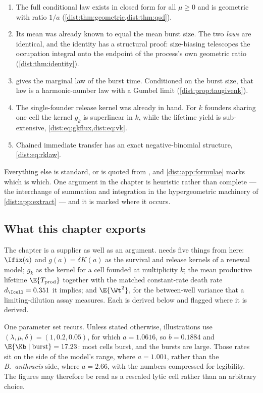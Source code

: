 \begin{enumerate}[leftmargin=*,itemsep=2pt]
\item The full conditional law exists in closed form for all $\mu\ge0$ and is
geometric with ratio $1/a$ (\cref{dist:thm:geometric,dist:thm:qsd}).
\item Its mean was already known to equal the mean burst size. The two
\emph{laws} are identical, and the identity has a structural proof:
size-biasing telescopes the occupation integral onto the endpoint of the
process's own geometric ratio (\cref{dist:thm:identity}).
\item \ChCorecap{} gives the marginal law of the burst time. Conditioned on
the burst size, that law is a harmonic-number law with a Gumbel limit
(\cref{dist:prop:taugivenk}).
\item The single-founder release kernel was already in hand. For $k$ founders
sharing one cell the kernel $g_k$ is superlinear in $k$, while the lifetime
yield is sub-extensive, \cref{dist:eq:gkflux,dist:eq:vk}.
\item Chained immediate transfer has an exact negative-binomial structure,
\cref{dist:eq:rklaw}.
\end{enumerate}

Everything else is standard, or is quoted from \ChCore, and
\cref{dist:app:formulae} marks which is which. One argument in the chapter is
heuristic rather than complete --- the interchange of summation and
integration in the hypergeometric machinery of \cref{dist:app:extract} ---
and it is marked where it occurs.

\subsection{What this chapter exports}
\label{dist:sec:exports}

The chapter is a supplier as well as an argument. \ChPopcap{} needs five things
from here: $\Ifix(a)$ and $g(a)=\delta K(a)$ as the survival and release
kernels of a renewal model; $g_k$ as the kernel for a cell founded at
multiplicity $k$; the mean productive lifetime $\E{T_{\rm prod}}$ together
with the matched
constant-rate death rate $d_{\Icell}=0.351$ it implies; and $\E{\Wt^2}$, for
the between-well variance that a limiting-dilution assay measures. Each is
derived below and flagged where it is derived.

One parameter set recurs. Unless stated otherwise, illustrations use
$(\lambda,\mu,\delta)=(1,0.2,0.05)$, for which $a=1.0616$, so $b=0.1884$ and
$\E{\Kb\mid\text{burst}}=17.23$: most cells burst, and the bursts are large.
Those rates sit on the \ft{} side of the model's range, where $a=1.001$,
rather than the \textit{B.~anthracis} side, where $a=2.66$, with the numbers
compressed for legibility. The figures may therefore be read as a rescaled
lytic cell rather than an arbitrary choice.
